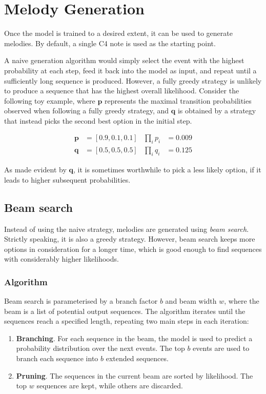 \documentclass[../../report.tex]{subfiles}
\begin{document}
\section{Melody Generation}

Once the model is trained to a desired extent, it can be used to generate
melodies. By default, a single C4 note is used as the starting point.

A naive generation algorithm would simply select the event with the highest
probability at each step, feed it back into the model as input, and repeat until
a sufficiently long sequence is produced. However, a fully greedy strategy is
unlikely to produce a sequence that has the highest overall likelihood. Consider
the following toy example, where \(\bm{p}\) represents the maximal transition
probabilities observed when following a fully greedy strategy, and \(\bm{q}\) is
obtained by a strategy that instead picks the second best option in the initial
step.

\begin{align*}
  \bm{p} &= [0.9, 0.1, 0.1] & \prod_{i} p_i &= 0.009
  \\
  \bm{q} &= [0.5, 0.5, 0.5] & \prod_{i} q_i &= 0.125
\end{align*}

As made evident by \(\bm{q}\), it is sometimes worthwhile to pick a less likely
option, if it leads to higher subsequent probabilities.

\subsection{Beam search}

Instead of using the naive strategy, melodies are generated using \emph{beam
search}. Strictly speaking, it is also a greedy strategy. However, beam search
keeps more options in consideration for a longer time, which is good enough to
find sequences with considerably higher likelihoods.

\subsubsection{Algorithm}

Beam search is parameterised by a branch factor \(b\) and beam width \(w\),
where the beam is a list of potential output sequences. The algorithm iterates
until the sequences reach a specified length, repeating two main steps in each
iteration:

\begin{enumerate}
  \item \textbf{Branching}. For each sequence in the beam, the model is used to
  predict a probability distribution over the next events. The top \(b\) events
  are used to branch each sequence into \(b\) extended sequences.

  \item \textbf{Pruning}. The sequences in the current beam are sorted by
  likelihood. The top \(w\) sequences are kept, while others are discarded.
\end{enumerate}
\end{document}
